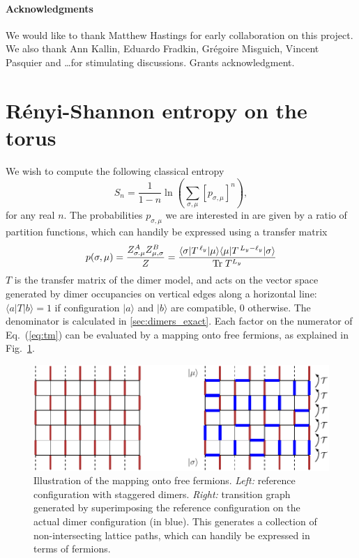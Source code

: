 \documentclass[11pt]{iopart}
\begin{document}
\paragraph{Acknowledgments}
 We would like to thank Matthew Hastings for early collaboration on this project. We also thank Ann Kallin, Eduardo Fradkin, Gr\'egoire Misguich, Vincent Pasquier and \ldots for stimulating discussions. Grants acknowledgment. 
 \appendix
 \clearpage

\section[\;\;\;\;\;\;\;\;\;\;\;\;\;\;R\'enyi-Shannon entropy on the torus]{R\'enyi-Shannon entropy on the torus}
\label{sec:lgv}
We wish to compute the following classical entropy
\begin{equation}
 S_n=\frac{1}{1-n} \ln \left(\sum_{\sigma,\mu} [p_{\sigma,\mu}]^n\right), 
\end{equation}
for any real $n$. The probabilities $p_{\sigma,\mu}$ we are interested in are given by a ratio of partition functions, which can handily be expressed using a transfer matrix
\begin{equation}\label{eq:tm}
 p(\sigma,\mu)=\frac{Z_{\sigma.\mu}^A Z_{\mu,\sigma}^B}{Z}=\frac{\langle  \sigma|T^{\,\ell_y}|\mu\rangle\langle \mu|T^{\,L_y-\ell_y}|\sigma\rangle}{{\rm Tr}\; T^{L_y}}
\end{equation}
$T$ is the transfer matrix of the dimer model, and acts on the vector space generated by dimer occupancies on vertical edges along a horizontal line: $\langle a|T|b\rangle=1$ if configuration $|a\rangle$ and $|b\rangle$ are compatible, $0$ otherwise. The denominator is calculated in \ref{sec:dimers_exact}. Each factor on the numerator of Eq.~(\ref{eq:tm}) can be evaluated by a mapping onto free fermions\cite{Lieb1967,Alet_dimers2,Shannonee}, as explained in Fig.~\ref{fig:freefermions}.  
\begin{figure}[ht]
\begin{center}
\includegraphics{./figures/free_fermions.pdf}
  \end{center}
  \caption{Illustration of the mapping onto free fermions. \emph{Left:} reference configuration with staggered dimers. \emph{Right:} transition graph generated by superimposing the reference configuration on the actual dimer configuration (in blue). This generates a collection of non-intersecting lattice paths, which can handily be expressed in terms of fermions. }
  \label{fig:freefermions}
  \end{figure}
\end{document}
